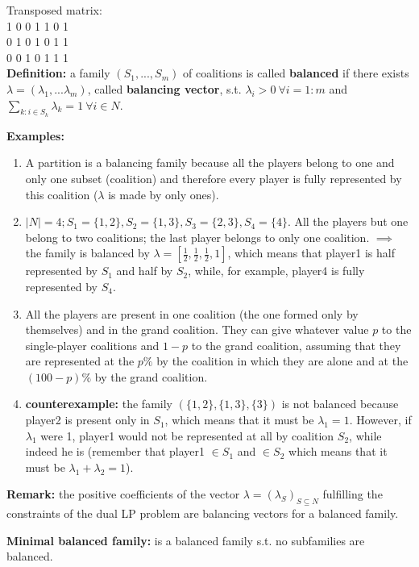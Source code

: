\noindent Transposed matrix:\\
1	0	0	1	1	0	1\\
0	1	0	1	0	1	1\\
0	0	1	0	1	1	1\\

\bigskip
\noindent \textbf{Definition:} a family $(S_1,...,S_m)$ of coalitions is called \textbf{balanced} if there exists  $\lambda = (\lambda_1,...\lambda_m)$, called \textbf{balancing vector}, s.t. $\lambda_i > 0 ~\forall i=1:m$ and $\sum_{k: i \in S_k}\lambda_k = 1 ~\forall i \in N$.

\bigskip
\noindent \textbf{Examples:}
\begin{enumerate}
\item A partition is a balancing family because all the players belong to 
one and only one subset (coalition) and therefore every player is fully 
represented by this coalition ($\lambda$ is made by only ones).
\item $|N| = 4; S_1 = \{1,2\}, S_2 = \{1,3\}, S_3 = \{2,3\}, S_4 = \{4\}$. All the players but one belong to two coalitions; the 
last player belongs to only one coalition. $\implies$ the family is balanced by $\lambda = \left[\frac{1}{2},\frac{1}{2},\frac{1}{2},1\right]$, which means that player1 is half represented by $S_1$ and half by $S_2$, while, for example, player4 is fully represented by $S_4$.
\item All the players are present in one coalition (the one formed only by themselves) and in the grand coalition. 
They can give whatever value $p$ to the single-player coalitions and $1-p$ to the grand coalition, assuming that they are represented at the $p\%$ by the coalition in which they are alone and at the $(100-p)\%$ by the grand coalition.
\item \textbf{counterexample:} the family $(\{1,2\},\{1,3\},\{3\})$ is not balanced because player2 is present only in $S_1$, which means that it must be $\lambda_1 = 1$. However, if $\lambda_1$ were 1, player1 would not be represented at all by coalition $S_2$, while indeed he is (remember that player1 $\in S_1$ and $\in S_2$ which means that it must be $\lambda_1 + \lambda_2 = 1$).
\end{enumerate}

\bigskip
\noindent \textbf{Remark:} the positive coefficients of the vector $\lambda = (\lambda_S)_{S \subseteq N}$ fulfilling the constraints of the dual LP problem are balancing vectors for a balanced family.

\bigskip
\noindent \textbf{Minimal balanced family:} is a balanced family s.t. no subfamilies are balanced.

